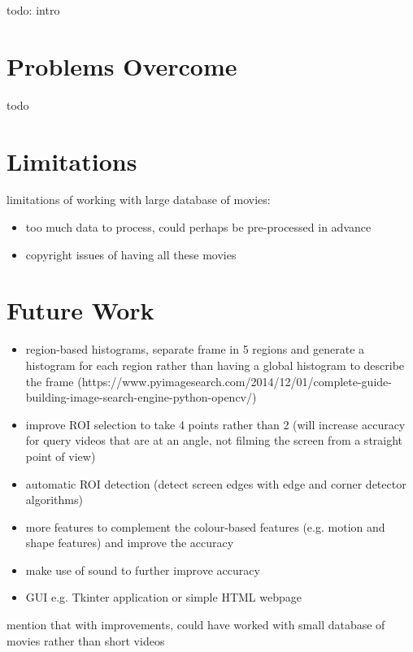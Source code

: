 todo: intro


\section{Problems Overcome}

todo


\section{Limitations}

limitations of working with large database of movies: 
\begin{itemize}
    \item too much data to process, could perhaps be pre-processed in advance
    \item copyright issues of having all these movies
\end{itemize}
    

\section{Future Work}

\begin{itemize}
    \item region-based histograms, separate frame in 5 regions and generate a histogram for each region rather than having a global histogram to describe the frame (https://www.pyimagesearch.com/2014/12/01/complete-guide-building-image-search-engine-python-opencv/)
    \item improve ROI selection to take 4 points rather than 2 (will increase accuracy for query videos that are at an angle, not filming the screen from a straight point of view)
    \item automatic ROI detection (detect screen edges with edge and corner detector algorithms)
    \item more features to complement the colour-based features (e.g. motion and shape features) and improve the accuracy
    \item make use of sound to further improve accuracy
    \item GUI e.g. Tkinter application or simple HTML webpage
\end{itemize} 
mention that with improvements, could have worked with small database of movies rather than short videos
    
